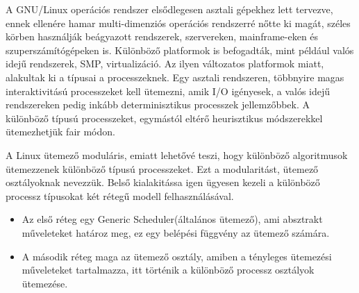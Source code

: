 
A GNU/Linux operációs rendszer elsődlegesen asztali gépekhez lett tervezve, ennek ellenére hamar multi-dimenziós operációs rendszerré nőtte ki magát, széles körben használják beágyazott rendszerek, szervereken, mainframe-eken és szuperszámítógépeken is. Különböző platformok is befogadták, mint például valós idejű rendszerek, SMP, virtualizáció. Az ilyen változatos platformok miatt, alakultak ki a típusai a processzeknek. Egy asztali rendszeren, többnyire magas interaktivitású processzeket kell ütemezni, amik I/O igényesek, a valós idejű rendszereken pedig inkább  determinisztikus processzek jellemzőbbek. A különböző típusú processzeket, egymástól eltérő heurisztikus módszerekkel ütemezhetjük fair módon.

A Linux ütemező moduláris, emiatt lehetővé teszi, hogy különböző algoritmusok ütemezzenek különböző típusú processzeket. Ezt a modularitást, ütemező osztályoknak nevezzük. Belső kialakitássa igen ügyesen kezeli a különböző processz típusokat két rétegű modell felhasználásával.
\begin{itemize}
	\item Az első réteg egy Generic Scheduler(általános ütemező), ami absztrakt műveleteket határoz meg, ez egy belépési függvény az ütemező számára.
	\item A második réteg maga az ütemező osztály, amiben a tényleges ütemezési műveleteket tartalmazza, itt történik a különböző  processz osztályok ütemezése.
\end{itemize} 

